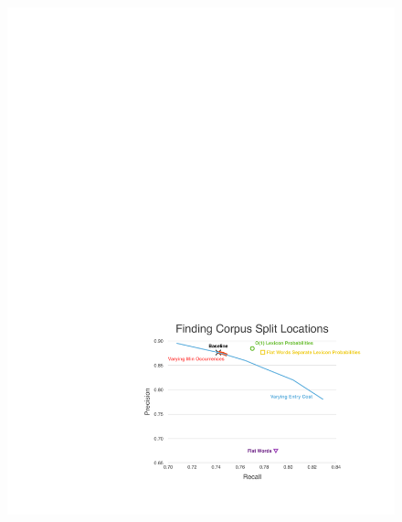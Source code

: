 \documentclass[11pt, oneside, fleqn]{article}
\begin{document}
  \begin{figure}[h]
  \includegraphics{./figure/finding_corpus_split_location.pdf}
  \end{figure}
\end{document}
